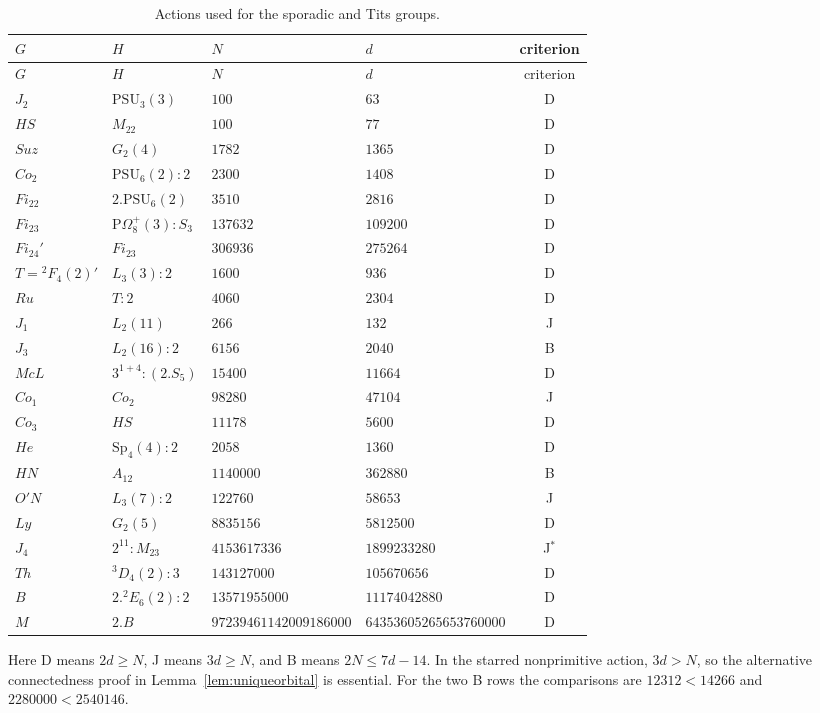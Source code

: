 \documentclass[11pt]{article}
\theoremstyle{definition}
\newcommand{\Sp}{\mathrm{Sp}}
\newcommand{\PSU}{\mathrm{PSU}}
\begin{document}
\begingroup\small
\begin{longtable}{@{}llllc@{}}
\caption{Actions used for the sporadic and Tits groups.}\label{tab:sporadic}\\
\toprule
$G$ & $H$ & $N$ & $d$ & criterion\\
\midrule\endfirsthead
\toprule $G$ & $H$ & $N$ & $d$ & criterion\\\midrule\endhead
$J_2$ & $\PSU_3(3)$ & $100$ & $63$ & D\\
$HS$ & $M_{22}$ & $100$ & $77$ & D\\
$Suz$ & $G_2(4)$ & $1782$ & $1365$ & D\\
$Co_2$ & $\PSU_6(2):2$ & $2300$ & $1408$ & D\\
$Fi_{22}$ & $2.\PSU_6(2)$ & $3510$ & $2816$ & D\\
$Fi_{23}$ & $\mathrm P\Omega_8^+(3):S_3$ & $137632$ & $109200$ & D\\
$Fi_{24}'$ & $Fi_{23}$ & $306936$ & $275264$ & D\\
$T={}^2F_4(2)'$ & $L_3(3):2$ & $1600$ & $936$ & D\\
$Ru$ & $T:2$ & $4060$ & $2304$ & D\\
$J_1$ & $L_2(11)$ & $266$ & $132$ & J\\
$J_3$ & $L_2(16):2$ & $6156$ & $2040$ & B\\
$McL$ & $3^{1+4}:(2.S_5)$ & $15400$ & $11664$ & D\\
$Co_1$ & $Co_2$ & $98280$ & $47104$ & J\\
$Co_3$ & $HS$ & $11178$ & $5600$ & D\\
$He$ & $\Sp_4(4):2$ & $2058$ & $1360$ & D\\
$HN$ & $A_{12}$ & $1140000$ & $362880$ & B\\
$O'N$ & $L_3(7):2$ & $122760$ & $58653$ & J\\
$Ly$ & $G_2(5)$ & $8835156$ & $5812500$ & D\\
$J_4$ & $2^{11}:M_{23}$ & $4153617336$ & $1899233280$ & J$^*$\\
$Th$ & ${}^3D_4(2):3$ & $143127000$ & $105670656$ & D\\
$B$ & $2.{}^2E_6(2):2$ & $13571955000$ & $11174042880$ & D\\
$M$ & $2.B$ & $97239461142009186000$ & $64353605265653760000$ & D\\
\bottomrule
\end{longtable}
\endgroup
Here D means $2d\ge N$, J means $3d\ge N$, and B means $2N\le7d-14$. In the starred nonprimitive action, $3d>N$, so the alternative connectedness proof in Lemma~\ref{lem:uniqueorbital} is essential. For the two B rows the comparisons are $12312<14266$ and $2280000<2540146$.
\end{document}
